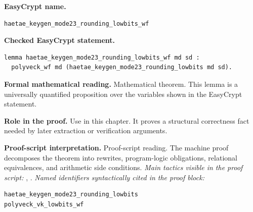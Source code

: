 \begin{formaltheorem}
\noindent\textbf{EasyCrypt name.}
\begin{lstlisting}[language=EasyCrypt,basicstyle=\ttfamily\scriptsize]
haetae_keygen_mode23_rounding_lowbits_wf
\end{lstlisting}
\noindent\textbf{Checked EasyCrypt statement.}
\begin{lstlisting}[language=EasyCrypt,basicstyle=\ttfamily\scriptsize]
lemma haetae_keygen_mode23_rounding_lowbits_wf md sd :
  polyveck_wf md (haetae_keygen_mode23_rounding_lowbits md sd).
\end{lstlisting}
\noindent\textbf{Formal mathematical reading.}
Mathematical theorem. This lemma is a universally quantified proposition over the variables shown in the EasyCrypt statement.

\noindent\textbf{Role in the proof.}
Use in this chapter. It proves a structural correctness fact needed by later extraction or verification arguments.

\noindent\textbf{Proof-script interpretation.}
Proof-script reading. The machine proof decomposes the theorem into rewrites, program-logic obligations, relational equivalences, and arithmetic side conditions.
\emph{Main tactics visible in the proof script:} , .
\emph{Named identifiers syntactically cited in the proof block:}
\begin{lstlisting}[language=EasyCrypt,basicstyle=\ttfamily\scriptsize]
haetae_keygen_mode23_rounding_lowbits
polyveck_vk_lowbits_wf
\end{lstlisting}

\end{formaltheorem}

